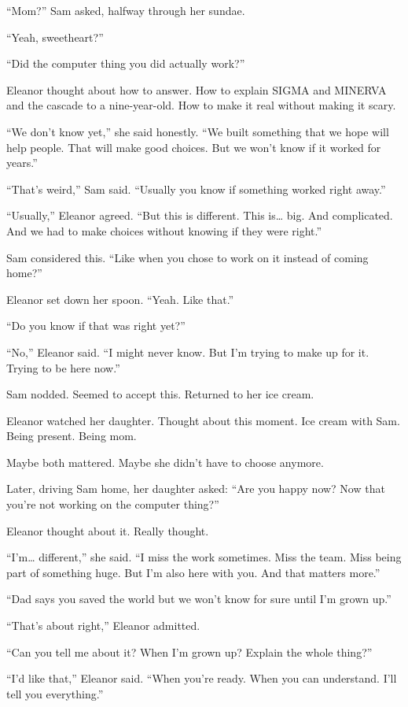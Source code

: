 ``Mom?'' Sam asked, halfway through her sundae.

``Yeah, sweetheart?''

``Did the computer thing you did actually work?''

Eleanor thought about how to answer. How to explain SIGMA and MINERVA and the cascade to a nine-year-old. How to make it real without making it scary.

``We don't know yet,'' she said honestly. ``We built something that we hope will help people. That will make good choices. But we won't know if it worked for years.''

``That's weird,'' Sam said. ``Usually you know if something worked right away.''

``Usually,'' Eleanor agreed. ``But this is different. This is\ldots{} big. And complicated. And we had to make choices without knowing if they were right.''

Sam considered this. ``Like when you chose to work on it instead of coming home?''

Eleanor set down her spoon. ``Yeah. Like that.''

``Do you know if that was right yet?''

``No,'' Eleanor said. ``I might never know. But I'm trying to make up for it. Trying to be here now.''

Sam nodded. Seemed to accept this. Returned to her ice cream.

Eleanor watched her daughter. Thought about this moment. Ice cream with Sam. Being present. Being mom.

Maybe both mattered. Maybe she didn't have to choose anymore.

\scenebreak

Later, driving Sam home, her daughter asked: ``Are you happy now? Now that you're not working on the computer thing?''

Eleanor thought about it. Really thought.

``I'm\ldots{} different,'' she said. ``I miss the work sometimes. Miss the team. Miss being part of something huge. But I'm also here with you. And that matters more.''

``Dad says you saved the world but we won't know for sure until I'm grown up.''

``That's about right,'' Eleanor admitted.

``Can you tell me about it? When I'm grown up? Explain the whole thing?''

``I'd like that,'' Eleanor said. ``When you're ready. When you can understand. I'll tell you everything.''

